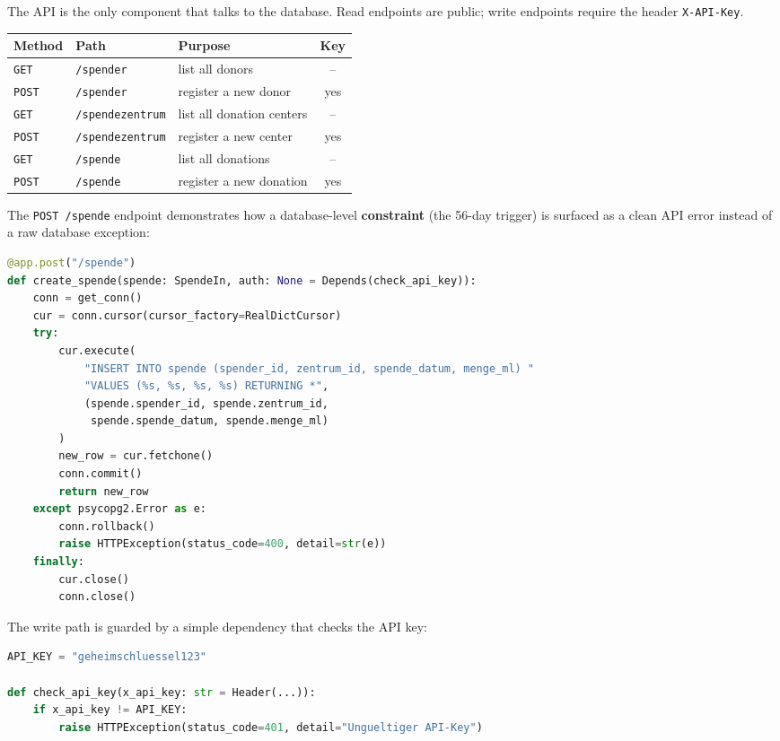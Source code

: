 \documentclass[11pt,a4paper]{article}
\begin{document}
The API is the only component that talks to the database. Read endpoints are
public; write endpoints require the header \texttt{X-API-Key}.

\renewcommand{\arraystretch}{1.2}
\begin{tabularx}{\linewidth}{@{}p{1.6cm}p{4.4cm}Xc@{}}
\toprule
\textbf{Method} & \textbf{Path} & \textbf{Purpose} & \textbf{Key} \\
\midrule
\texttt{GET}  & \texttt{/spender} & list all donors & -- \\
\texttt{POST} & \texttt{/spender} & register a new donor & yes \\
\texttt{GET}  & \texttt{/spendezentrum} & list all donation centers & -- \\
\texttt{POST} & \texttt{/spendezentrum} & register a new center & yes \\
\texttt{GET}  & \texttt{/spende} & list all donations & -- \\
\texttt{POST} & \texttt{/spende} & register a new donation & yes \\
\bottomrule
\end{tabularx}

\medskip
The \texttt{POST /spende} endpoint demonstrates how a database-level
\textbf{constraint} (the 56-day trigger) is surfaced as a clean API error
instead of a raw database exception:

\begin{lstlisting}[language=Python, caption={POST /spende -- catching the trigger's exception}]
@app.post("/spende")
def create_spende(spende: SpendeIn, auth: None = Depends(check_api_key)):
    conn = get_conn()
    cur = conn.cursor(cursor_factory=RealDictCursor)
    try:
        cur.execute(
            "INSERT INTO spende (spender_id, zentrum_id, spende_datum, menge_ml) "
            "VALUES (%s, %s, %s, %s) RETURNING *",
            (spende.spender_id, spende.zentrum_id,
             spende.spende_datum, spende.menge_ml)
        )
        new_row = cur.fetchone()
        conn.commit()
        return new_row
    except psycopg2.Error as e:
        conn.rollback()
        raise HTTPException(status_code=400, detail=str(e))
    finally:
        cur.close()
        conn.close()
\end{lstlisting}

The write path is guarded by a simple dependency that checks the API key:

\begin{lstlisting}[language=Python, caption={API-key guard}]
API_KEY = "geheimschluessel123"

def check_api_key(x_api_key: str = Header(...)):
    if x_api_key != API_KEY:
        raise HTTPException(status_code=401, detail="Ungueltiger API-Key")
\end{lstlisting}
\end{document}
